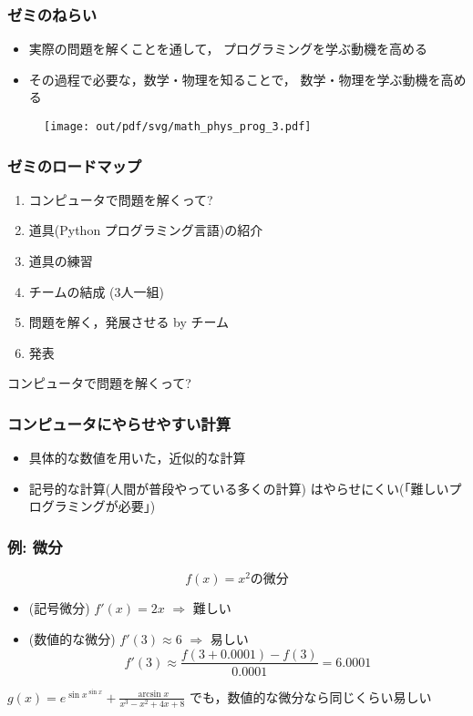 \documentclass[12pt,dvipdfmx]{beamer}
\begin{document}
\begin{frame}
\frametitle{ゼミのねらい}
\begin{itemize}
\item 実際の問題を解くことを通して，
  プログラミングを学ぶ動機を高める
\item その過程で必要な，数学・物理を知ることで，
  数学・物理を学ぶ動機を高める
\end{itemize}

% 

\begin{figure}[htbp]
  \centering
\texttt{[image: out/pdf/svg/math\_phys\_prog\_3.pdf]}
\end{figure}

\end{frame}

\begin{frame}
\frametitle{ゼミのロードマップ}
\begin{enumerate}
\item コンピュータで問題を解くって?
\item 道具(Python プログラミング言語)の紹介
\item 道具の練習
\item チームの結成 (3人一組)
\item 問題を解く，発展させる by チーム
\item 発表
\end{enumerate}
\end{frame}

\begin{frame}

コンピュータで問題を解くって?

\end{frame}


\begin{frame}
\frametitle{コンピュータにやらせやすい計算}
\begin{itemize}
\item 具体的な数値を用いた，近似的な計算
\item 記号的な計算(人間が普段やっている多くの計算)
はやらせにくい(「難しいプログラミングが必要」)
\end{itemize}
\end{frame}


\begin{frame}
\frametitle{例: 微分}
\[ f(x) = x^2 \mbox{の微分} \]
\begin{itemize}
\item (記号微分) $f'(x) = 2x$ $\Rightarrow$ 難しい
\item (数値的な微分) $f'(3) \approx 6$ $\Rightarrow$ 易しい
\[ f'(3) \approx \frac{f(3+0.0001) - f(3)}{0.0001} = 6.0001 \]
\end{itemize}

$g(x) = e^{\sin x^{\sin x}} + \frac{\arcsin x}{x^3 - x^2 + 4x + 8}$
でも，数値的な微分なら同じくらい易しい
\end{frame}
\end{document}
